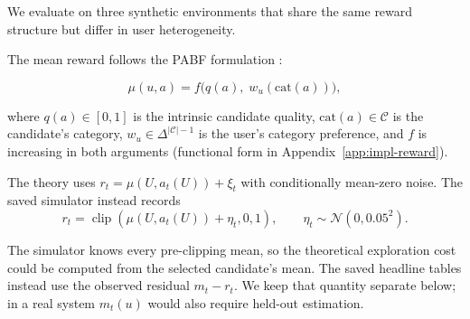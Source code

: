 \documentclass{article} %
\begin{document}
\label{sec:exp-setup}

We evaluate on three synthetic environments that share the same reward structure but differ in user heterogeneity.

The mean reward follows the PABF formulation \citep{jin2026personalizing}:

\begin{equation}
\label{eq:exp-mu}
\mu(u,a) = f\bigl(q(a),\; w_u(\mathrm{cat}(a))\bigr),
\end{equation}

where $q(a)\in[0,1]$ is the intrinsic candidate quality, $\mathrm{cat}(a)\in\mathcal{C}$ is the candidate's category, $w_u\in\Delta^{|\mathcal{C}|-1}$ is the user's category preference, and $f$ is increasing in both arguments (functional form in Appendix~\ref{app:impl-reward}).

The theory uses $r_t=\mu(U,a_t(U))+\xi_t$ with conditionally mean-zero noise. The saved simulator instead records
\begin{equation}
\label{eq:exp-clipped-reward}
r_t=\operatorname{clip}\!\left(\mu(U,a_t(U))+\eta_t,0,1\right),
\qquad
\eta_t\sim\mathcal N(0,0.05^2).
\end{equation}

The simulator knows every pre-clipping mean, so the theoretical exploration cost could be computed from the selected candidate's mean. The saved headline tables instead use the observed residual \(m_t-r_t\). We keep that quantity separate below; in a real system \(m_t(u)\) would also require held-out estimation.
\end{document}
